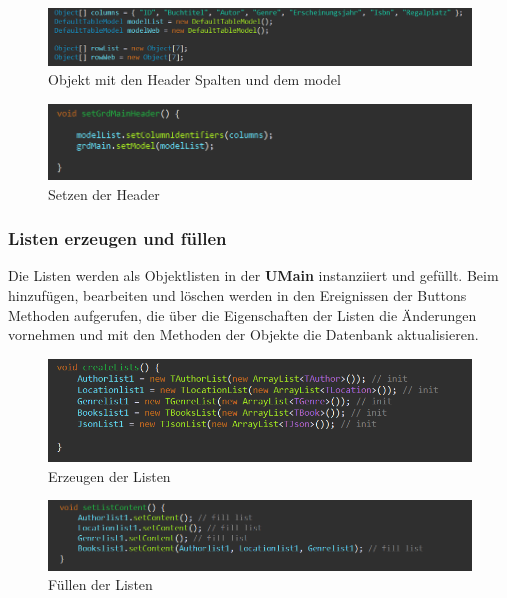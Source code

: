 \begin{figure}[h]
\begin{center}
\includegraphics[width=15cm]{img/model.png}
\caption{Objekt mit den Header Spalten und dem model}
\label{model}
\end{center}
\end{figure}

\begin{figure}[h]
\begin{center}
\includegraphics[width=15cm]{img/setheader.png}
\caption{Setzen der Header}
\label{header}
\end{center}
\end{figure}

\subsubsection{Listen erzeugen und füllen}
Die Listen werden als Objektlisten in der \textbf{UMain} instanziiert und gefüllt.
Beim hinzufügen, bearbeiten und löschen werden in den Ereignissen der Buttons Methoden aufgerufen, die über die Eigenschaften der Listen die Änderungen vornehmen und mit den Methoden der Objekte die Datenbank aktualisieren.

\begin{figure}[h]
\begin{center}
\includegraphics[width=15cm]{img/listcreate.png}
\caption{Erzeugen der Listen}
\label{listcreate}
\end{center}
\end{figure}

\begin{figure}[h]
\begin{center}
\includegraphics[width=15cm]{img/setlistcontent.png}
\caption{Füllen der Listen}
\label{listcontent}
\end{center}
\end{figure}



